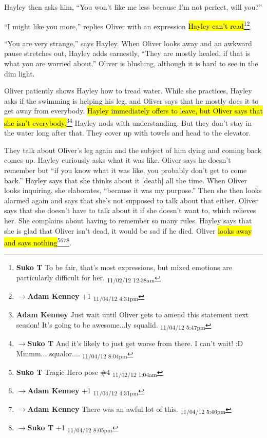 Hayley then asks him, ``You won't like me less because I'm not perfect, will you?''

``I might like you more,'' replies Oliver with an expression \hl{Hayley can't read}\footnote{\textbf{Suko T }To be fair, that's most expressions, but mixed emotions are particularly difficult for her. \textsubscript{11/02/12 12:38am}}\footnote{$\rightarrow$\textbf{Adam Kenney }+1 \textsubscript{11/04/12 4:31pm}}.

``You are very strange,'' says Hayley.  When Oliver looks away and an awkward pause stretches out, Hayley adds earnestly, ``They are mostly healed, if that is what you are worried about.''  Oliver is blushing, although it is hard to see in the dim light.



Oliver patiently shows Hayley how to tread water. While she practices, Hayley asks if the swimming is helping his leg, and Oliver says that he mostly does it to get away from everybody.  \hl{Hayley immediately offers to leave, but Oliver says that she isn't everybody.}\footnote{\textbf{Adam Kenney }Just wait until Oliver gets to amend this statement next session!  It's going to be awesome...ly squalid. \textsubscript{11/04/12 5:47pm}}\footnote{$\rightarrow$\textbf{Suko T }And it's likely to just get worse from there.  I can't wait! :D  Mmmm... squalor.... \textsubscript{11/04/12 8:04pm}}  Hayley nods with understanding.  But they don't stay in the water long after that.  They cover up with towels and head to the elevator. 



They talk about Oliver's leg again and the subject of him dying and coming back comes up.  Hayley curiously asks what it was like.  Oliver says he doesn't remember but ``if you know what it was like, you probably don't get to come back.''  Hayley says that she thinks about it {[}death{]} all the time.  When Oliver looks inquiring, she elaborates, ``because it was my purpose.''  Then she then looks alarmed again and says that she's not supposed to talk about that either.  Oliver says that she doesn't have to talk about it if she doesn't want to, which relieves her. She complains about having to remember so many rules.  Hayley says that she is glad that Oliver isn't dead, it would be sad if he died.  Oliver \hl{looks away and says nothing}\footnote{\textbf{Suko T }Tragic Hero pose \#4 \textsubscript{11/02/12 1:04am}}\footnote{$\rightarrow$\textbf{Adam Kenney }+1 \textsubscript{11/04/12 4:31pm}}\footnote{$\rightarrow$\textbf{Adam Kenney }There was an awful lot of this. \textsubscript{11/04/12 5:46pm}}\footnote{$\rightarrow$\textbf{Suko T }+1 \textsubscript{11/04/12 8:05pm}}.




